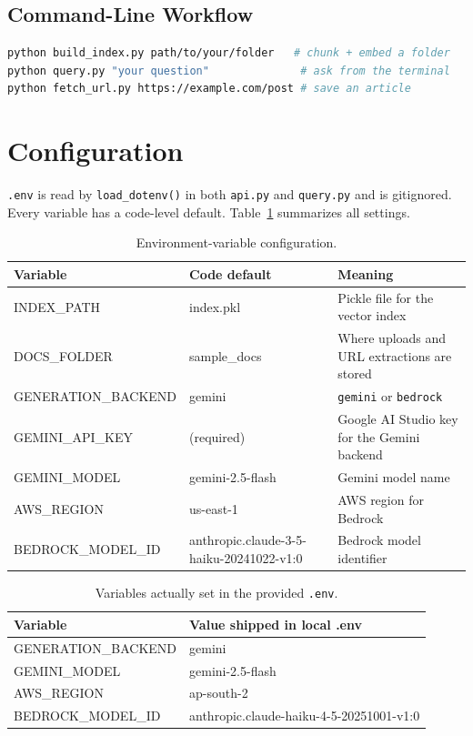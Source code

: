 \documentclass[11pt,a4paper]{article}
\newcommand{\code}[1]{\texttt{#1}}
\begin{document}
\subsection{Command-Line Workflow}
\begin{lstlisting}[language=bash, style=bashstyle]
python build_index.py path/to/your/folder   # chunk + embed a folder
python query.py "your question"              # ask from the terminal
python fetch_url.py https://example.com/post # save an article
\end{lstlisting}

\section{Configuration}
\code{.env} is read by \code{load\_dotenv()} in both \code{api.py} and
\code{query.py} and is gitignored. Every variable has a code-level default.
Table~\ref{tab:env} summarizes all settings.

\begin{table}[h]
\centering
\small
\begin{tabular}{>{\ttfamily}p{3.5cm} >{\ttfamily}p{3.6cm} p{7.7cm}}
\toprule
\textbf{Variable} & \textbf{Code default} & \textbf{Meaning} \\
\midrule
INDEX\_PATH             & index.pkl & Pickle file for the vector index \\
DOCS\_FOLDER            & sample\_docs & Where uploads and URL extractions are stored \\
GENERATION\_BACKEND     & gemini    & \code{gemini} or \code{bedrock} \\
GEMINI\_API\_KEY        & (required) & Google AI Studio key for the Gemini backend \\
GEMINI\_MODEL           & gemini-2.5-flash & Gemini model name \\
AWS\_REGION             & us-east-1 & AWS region for Bedrock \\
BEDROCK\_MODEL\_ID      & anthropic.claude-3-5-haiku-20241022-v1:0 & Bedrock model identifier \\
\bottomrule
\end{tabular}
\caption{Environment-variable configuration.}
\label{tab:env}
\end{table}

\begin{table}[h]
\centering
\small
\begin{tabular}{>{\ttfamily}p{3.5cm} p{11.3cm}}
\toprule
\textbf{Variable} & \textbf{Value shipped in local .env} \\
\midrule
GENERATION\_BACKEND & gemini \\
GEMINI\_MODEL       & gemini-2.5-flash \\
AWS\_REGION         & ap-south-2 \\
BEDROCK\_MODEL\_ID  & anthropic.claude-haiku-4-5-20251001-v1:0 \\
\bottomrule
\end{tabular}
\caption{Variables actually set in the provided \code{.env}.}
\label{tab:env-shipped}
\end{table}
\end{document}
